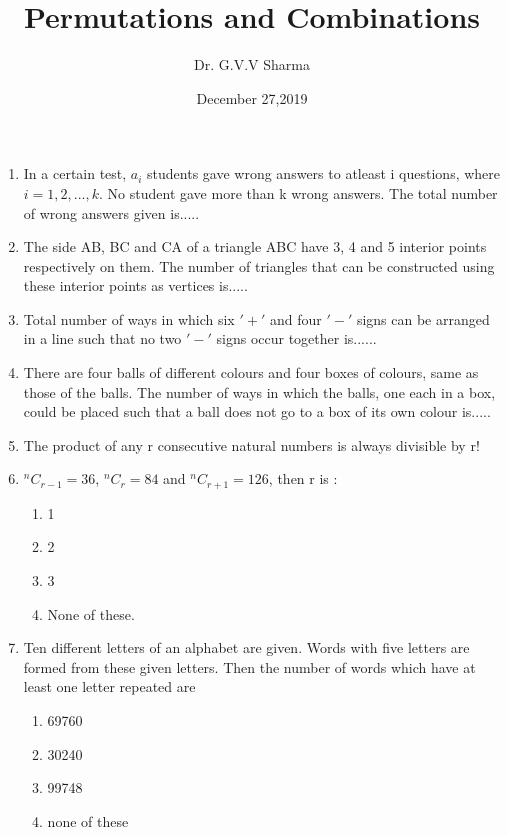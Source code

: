 \documentclass[journal,12pt,twocolumn]{IEEEtran}
\newcommand*{\Comb}[2]{{}^{#1}C_{#2}}%
\begin{document}
\title{Permutations and Combinations}
\author{Dr. G.V.V Sharma}
\date{December 27,2019}
\maketitle

\begin{enumerate}
\item In a certain test, $a_i$ students gave wrong answers to atleast i questions, where $i = 1,2,...,k.$ No student gave more than k wrong answers. The total number of wrong answers given is.....\\
\item The side AB, BC and CA of a triangle ABC have 3, 4 and 5 interior points respectively on them. The number of triangles that can be constructed using these interior points as vertices is.....\\
\item Total number of ways in which six $'+'$ and four $'-'$ signs can be arranged in a line such that no two $'-'$ signs occur together is......\\
\item There are four balls of different colours and four boxes of colours, same as those of the balls. The number of ways in which the balls, one each in a box, could be placed such that a ball does not go to a box of its own colour is.....\\
\item The product of any r consecutive natural numbers is always divisible by r!\\
\item $\Comb{n}{r-1} = 36$, $\Comb{n}{r} = 84$ and $\Comb{n}{r+1} = 126$, then r is :
\begin{enumerate}
\item 1
\item 2
\item 3
\item None of these.\\
\end{enumerate}
\item Ten different letters of an alphabet are given. Words with five letters are formed from these given letters. Then the number of words which have at least one letter repeated are
\begin{enumerate}
\item 69760
\item 30240
\item 99748
\item none of these\\

\end{enumerate}
\end{enumerate}
\end{document}

